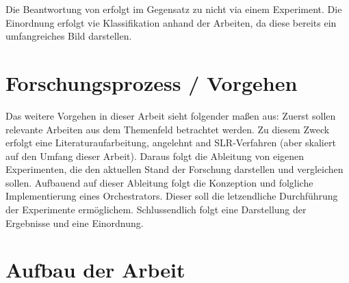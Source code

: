 Die Beantwortung von  erfolgt im Gegensatz zu  nicht via einem Experiment. Die Einordnung erfolgt vie Klassifikation anhand der Arbeiten, da diese bereits ein umfangreiches Bild darstellen.

\section{Forschungsprozess / Vorgehen}\label{ch:Forschungsprozess / Vorgehen}

Das weitere Vorgehen in dieser Arbeit sieht folgender maßen aus: Zuerst sollen relevante Arbeiten aus dem Themenfeld betrachtet werden. Zu diesem Zweck erfolgt eine Literaturaufarbeitung, angelehnt and SLR-Verfahren (aber skaliert auf den Umfang dieser Arbeit). Daraus folgt die Ableitung von eigenen Experimenten, die den aktuellen Stand der Forschung darstellen und vergleichen sollen. Aufbauend auf dieser Ableitung folgt die Konzeption und folgliche Implementierung eines Orchestrators. Dieser soll die letzendliche Durchführung der Experimente ermöglichem. Schlussendlich folgt eine Darstellung der Ergebnisse und eine Einordnung.

\section{Aufbau der Arbeit}\label{ch:Aufbau der Arbeit}









